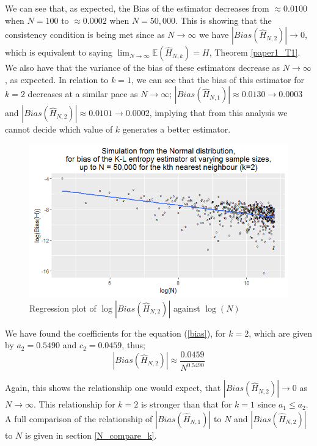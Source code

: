 \documentclass{report}
\begin{document}
We can see that, as expected, the Bias of the estimator decreases from $\approx 0.0100$ when $N=100$ to $\approx 0.0002$ when $N=50,000$. This is showing that the consistency condition is being met since as $N \to \infty$ we have $|Bias(\hat{H}_{N, 2})| \to 0$, which is equivalent to saying $\lim_{N \to \infty} \mathbb{E} (\hat{H}_{N, k}) = H$, Theorem \ref{paper1_T1}. We also have that the variance of the bias of these estimators decrease as $N \to \infty$, as expected. In relation to $k=1$, we can see that the bias of this estimator for $k=2$ decreases at a similar pace as $N \to \infty$; $|Bias(\hat{H}_{N, 1})| \approx 0.0130 \to 0.0003$ and $|Bias(\hat{H}_{N, 2})| \approx 0.0101 \to 0.0002$, implying that from this analysis we cannot decide which value of $k$ generates a better estimator.

\begin{figure}
  \begin{center}
    \includegraphics[width=\textwidth]{./Graphs/new_normal_k=2.png}
  \end{center}
\caption{Regression plot of $\log|Bias(\hat{H}_{N, 2})|$ against $\log(N)$}
  \label{normal_k=2_graph}
\end{figure}

We have found the coefficients for the equation (\ref{bias}), for $k=2$, which are given by $a_{2} = 0.5490$ and $c_{2} = 0.0459$, thus;
\begin{equation}
|Bias(\hat{H}_{N, 2})| \approx \frac{0.0459}{N^{0.5490}} \nonumber
\end{equation}

Again, this shows the relationship one would expect, that $|Bias(\hat{H}_{N, 2})| \to 0$ as $N \to \infty$. This relationship for $k=2$ is stronger than that for $k=1$ since $a_{1} \leq a_{2}$. A full comparison of the relationship of $|Bias(\hat{H}_{N, 1})|$ to $N$ and $|Bias(\hat{H}_{N, 2})|$ to $N$ is given in section \ref{N_compare_k}.
\end{document}
